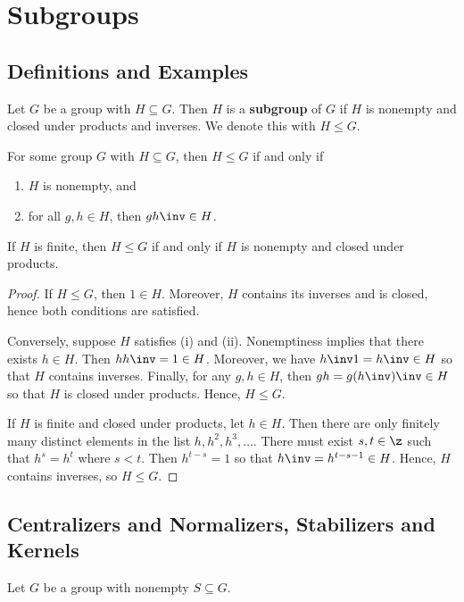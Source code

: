 \section{Subgroups}

\subsection{Definitions and Examples} \label{sec2.1}

 Let $G$ be a group with $H \subseteq G$. Then $H$ is a \textbf{subgroup} of $G$ if $H$ is nonempty and closed under products and inverses. We denote this with $H \leq G$.

 \label{prop2.1}
For some group $G$ with $H \subseteq G$, then $H \leq G$ if and only if
\begin{enumerate}
    \item $H$ is nonempty, and
    \item for all $g, h \in H$, then $gh\inv \in H$.
\end{enumerate}
If $H$ is finite, then $H \leq G$ if and only if $H$ is nonempty and closed under products.

\begin{proof}
    If $H \leq G$, then $1 \in H$. Moreover, $H$ contains its inverses and is closed, hence both conditions are satisfied.

    Conversely, suppose $H$ satisfies (i) and (ii). Nonemptiness implies that there exists $h \in H$. Then $hh\inv = 1 \in H$. Moreover, we have $h\inv 1 = h\inv \in H$ so that $H$ contains inverses. Finally, for any $g, h \in H$, then $gh = g(h\inv)\inv \in H$ so that $H$ is closed under products. Hence, $H \leq G$.

    If $H$ is finite and closed under products, let $h \in H$. Then there are only finitely many distinct elements in the list $h, h^2, h^3, \ldots$. There must exist $s, t \in \z$ such that $h^s = h^t$ where $s < t$. Then $h^{t - s} = 1$ so that $h\inv = h^{t - s - 1} \in H$. Hence, $H$ contains inverses, so $H \leq G$.
\end{proof}

\newpage

\subsection{Centralizers and Normalizers, Stabilizers and Kernels} \label{sec2.2}

Let $G$ be a group with nonempty $S \subseteq G$.

